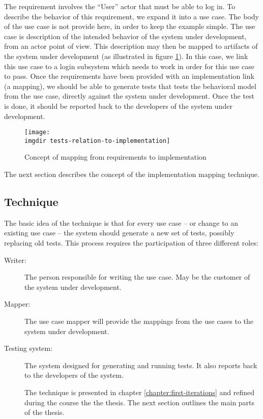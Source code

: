 \noindent
The requirement involves the ``User'' actor that must be able to log in. To describe the behavior of this requirement, we expand it into a use case. The body of the use case is not provide here, in order to keep the example simple. The use case is description of the intended behavior of the system under development, from an actor point of view. This description may then be mapped to artifacts of the system under development (as illustrated in figure \ref{fig:tests-relation-to-implementation}). In this case, we link this use case to a login subsystem which needs to work in order for this use case to pass. Once the requirements have been provided with an implementation link (a mapping), we should be able to generate tests that tests the behavioral model from the use case, directly against the system under development. Once the test is done, it should be reported back to the developers of the system under development.\medskip

\begin{figure}[!htbp]
\centering
\texttt{[image: \\imgdir tests-relation-to-implementation]}
\caption{Concept of mapping from requirements to implementation}
\label{fig:tests-relation-to-implementation}
\end{figure}

\noindent
The next section describes the concept of the implementation mapping technique.

\subsection{Technique}
The basic idea of the technique is that for every use case -- or change to an existing use case -- the system should generate a new set of tests, possibly replacing old tests. This process requires the participation of three different roles:

\begin{description}

  \item[Writer:] The person responsible for writing the use case. May be the customer of the system under development.

  \item[Mapper:] The use case mapper will provide the mappings from the use cases to the system under development.

  \item[Testing system:] The system designed for generating and running tests. It also reports back to the developers of the system.

The technique is presented in chapter \ref{chapter:first-iterations} and refined during the course the the thesis. The next section outlines the main parts of the thesis.

\end{description}

